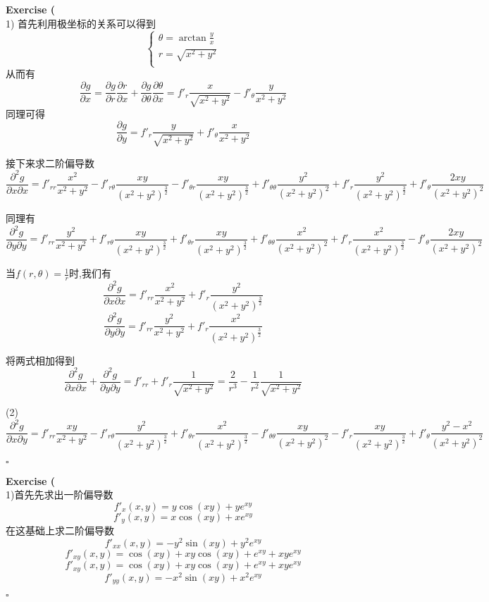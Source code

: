 \documentclass{article}
\newenvironment{exercise}[1]{%
{\textbf{Exercise #1} \\ 
    }
}{
  \hfill $\square$ 
  \par\bigskip 
}
\begin{document}
\begin{CJK}{UTF8}{gkai}
\begin{exercise}{13}
    (1)
    首先利用极坐标的关系可以得到
    \[\begin{cases}
        \theta = \arctan \frac{y}{x}\\
        r = \sqrt{x^2 + y^2}\\
    \end{cases}\]
    从而有
    \[\frac{\partial g}{\partial x} = \frac{\partial g}{\partial r} \frac{\partial r}{\partial x} + \frac{\partial g}{\partial \theta} \frac{\partial \theta}{\partial x} = f'_r \frac{x}{\sqrt{x^2 + y^2}} - f'_\theta \frac{y}{x^2 + y^2}\]
    同理可得
    \[\frac{\partial g}{\partial y} = f'_r \frac{y}{\sqrt{x^2 + y^2}} + f'_\theta \frac{x}{x^2 + y^2}\]

    接下来求二阶偏导数
    \[\frac{\partial^2 g}{\partial x \partial x} = f'_{rr} \frac{x^2}{x^2 + y^2} - f'_{r\theta} \frac{xy}{(x^2 + y^2)^{\frac{3}{2}}} - f'_{\theta r} \frac{xy}{(x^2 + y^2)^{\frac{3}{2}}} + f'_{\theta\theta} \frac{y^2}{(x^2 + y^2)^2} + f'_r \frac{y^2}{(x^2 + y^2)^{\frac{3}{2}}} + f'_\theta \frac{2xy}{(x^2 + y^2)^2}\]

    同理有
    \[\frac{\partial^2 g}{\partial y \partial y} = f'_{rr} \frac{y^2}{x^2 + y^2} + f'_{r\theta} \frac{xy}{(x^2 + y^2)^{\frac{3}{2}}} + f'_{\theta r} \frac{xy}{(x^2 + y^2)^{\frac{3}{2}}} + f'_{\theta\theta} \frac{x^2}{(x^2 + y^2)^2} + f'_r \frac{x^2}{(x^2 + y^2)^{\frac{3}{2}}} - f'_\theta \frac{2xy}{(x^2 + y^2)^2}\]

    当$f(r,\theta) = \frac{1}{r}$时,我们有
    \[\frac{\partial^2 g}{\partial x \partial x} = f'_{rr} \frac{x^2}{x^2 + y^2} + f'_r \frac{y^2}{(x^2 + y^2)^{\frac{3}{2}}}\]
    \[\frac{\partial^2 g}{\partial y \partial y} = f'_{rr} \frac{y^2}{x^2 + y^2} + f'_r \frac{x^2}{(x^2 + y^2)^{\frac{3}{2}}}\]

    将两式相加得到
    \[\frac{\partial^2 g}{\partial x \partial x} + \frac{\partial^2 g}{\partial y \partial y} = f'_{rr} + f'_r \frac{1}{\sqrt{x^2 + y^2}} = \frac{2}{r^3} - \frac{1}{r^2} \frac{1}{\sqrt{x^2 + y^2}}\]

    (2)
    \[\frac{\partial^2 g}{\partial x \partial y} = f'_{rr} \frac{xy}{x^2 + y^2} - f'_{r\theta} \frac{y^2}{(x^2 + y^2)^{\frac{3}{2}}} + f'_{\theta r} \frac{x^2}{(x^2 + y^2)^{\frac{3}{2}}} - f'_{\theta\theta} \frac{xy}{(x^2 + y^2)^2} - f'_r \frac{xy}{(x^2 + y^2)^{\frac{3}{2}}} + f'_\theta \frac{y^2 - x^2}{(x^2 + y^2)^2}\]
\end{exercise}

\begin{exercise}{14}
    (1)首先先求出一阶偏导数
    \[f'_x(x,y) = y \cos(xy) + y e^{xy}\]
    \[f'_y(x,y) = x \cos(xy) + x e^{xy}\]
    在这基础上求二阶偏导数
    \[f'_{xx}(x,y) = -y^2 \sin(xy) + y^2 e^{xy}\]
    \[f'_{xy}(x,y) = \cos(xy) + x y \cos(xy) + e^{xy} + xy e^{xy}\]
    \[f'_{xy}(x,y) = \cos(xy) + x y \cos(xy) + e^{xy} + xy e^{xy}\]
    \[f'_{yy}(x,y) = -x^2 \sin(xy) + x^2 e^{xy}\]


\end{exercise}
\end{CJK}
\end{document}
